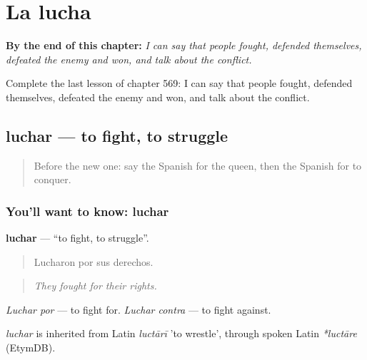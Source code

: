 
\chapter{La lucha}
\label{ch:es-la-lucha}

\begin{chapteropening}
\textbf{By the end of this chapter:} \emph{I can say that people fought, defended themselves, defeated the enemy and won, and talk about the conflict.}

Complete the last lesson of chapter 569: I can say that people fought, defended themselves, defeated the enemy and won, and talk about the conflict.
\end{chapteropening}

\section[luchar]{luchar — to fight, to struggle}

\label{lesson:ES-C569-luchar}



\begin{quote}
Before the new one: say the Spanish for the queen, then the Spanish for to conquer.
\end{quote}

\subsection*{You'll want to know: luchar}
\textbf{luchar} — \textquotedblleft{}to fight, to struggle\textquotedblright{}.

\begin{quote}
Lucharon por sus derechos.
\end{quote}

\begin{quote}
\emph{They fought for their rights.}
\end{quote}

\emph{Luchar por} — to fight for. \emph{Luchar contra} — to fight against.

\begin{cousinweb}
\emph{luchar} is inherited from Latin \emph{luctārī} 'to wrestle', through spoken Latin \emph{*luctāre} (EtymDB).
\end{cousinweb}

